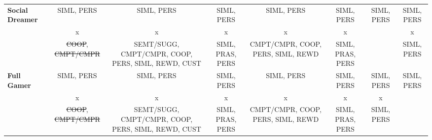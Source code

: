 \begin{landscape}
{\begin{longtable}{|l|c|c|c|c|c|c|c|}
\multirow{3}{*}{\textbf{Social Dreamer}}& 
\multicolumn{1}{|p{2.5cm}|}{\centering SIML, PERS}&%
\multicolumn{1}{|p{2.5cm}|}{\centering SIML, PERS}&%
\multicolumn{1}{|p{2.5cm}|}{\centering SIML, PERS}&%
\multicolumn{1}{|p{2.5cm}|}{\centering SIML, PERS}&%
\multicolumn{1}{|p{2.5cm}|}{\centering SIML, PERS}&%
\multicolumn{1}{|p{2.5cm}|}{\centering SIML, PERS}&%
\multicolumn{1}{|p{2.5cm}|}{\centering SIML, PERS}\tabularnewline
& 
\multicolumn{1}{|p{2.5cm}|}{\centering x}&
\multicolumn{1}{|p{2.5cm}|}{\centering x}&
\multicolumn{1}{|p{2.5cm}|}{\centering x}&
\multicolumn{1}{|p{2.5cm}|}{\centering x}&
\multicolumn{1}{|p{2.5cm}|}{\centering x}&
&
\multicolumn{1}{|p{2.5cm}|}{\centering x}\tabularnewline
& 
\multicolumn{1}{|p{2.5cm}|}{\centering \st{COOP}, \st{CMPT/CMPR}}&%
\multicolumn{1}{|p{2.5cm}|}{\centering \mbox{SEMT/SUGG}, \mbox{CMPT/CMPR}, COOP, PERS, SIML, REWD, CUST}&%
\multicolumn{1}{|p{2.5cm}|}{\centering SIML, PRAS, PERS}&%
\multicolumn{1}{|p{2.5cm}|}{\centering CMPT/CMPR, COOP, PERS, SIML, REWD}&%
\multicolumn{1}{|p{2.5cm}|}{\centering SIML, PRAS, PERS}&%
&%
\multicolumn{1}{|p{2.5cm}|}{\centering SIML, PERS}\tabularnewline
\hline

\multirow{3}{*}{\textbf{Full Gamer}}& 
\multicolumn{1}{|p{2.5cm}|}{\centering SIML, PERS}&%
\multicolumn{1}{|p{2.5cm}|}{\centering SIML, PERS}&%
\multicolumn{1}{|p{2.5cm}|}{\centering SIML, PERS}&%
\multicolumn{1}{|p{2.5cm}|}{\centering SIML, PERS}&%
\multicolumn{1}{|p{2.5cm}|}{\centering SIML, PERS}&%
\multicolumn{1}{|p{2.5cm}|}{\centering SIML, PERS}&%
\multicolumn{1}{|p{2.5cm}|}{\centering SIML, PERS}\tabularnewline
& 
\multicolumn{1}{|p{2.5cm}|}{\centering x}&
\multicolumn{1}{|p{2.5cm}|}{\centering x}&
\multicolumn{1}{|p{2.5cm}|}{\centering x}&
\multicolumn{1}{|p{2.5cm}|}{\centering x}&
\multicolumn{1}{|p{2.5cm}|}{\centering x}&
\multicolumn{1}{|p{2.5cm}|}{\centering x}&
\tabularnewline
& 
\multicolumn{1}{|p{2.5cm}|}{\centering \st{COOP}, \st{CMPT/CMPR}}&%
\multicolumn{1}{|p{2.5cm}|}{\centering \mbox{SEMT/SUGG}, \mbox{CMPT/CMPR}, COOP, PERS, SIML, REWD, CUST}&%
\multicolumn{1}{|p{2.5cm}|}{\centering SIML, PRAS, PERS}&%
\multicolumn{1}{|p{2.5cm}|}{\centering CMPT/CMPR, COOP, PERS, SIML, REWD}&%
\multicolumn{1}{|p{2.5cm}|}{\centering SIML, PRAS, PERS}&%
\multicolumn{1}{|p{2.5cm}|}{\centering SIML, PERS}&%
\tabularnewline
\hline

\end{longtable}
}\end{landscape}

